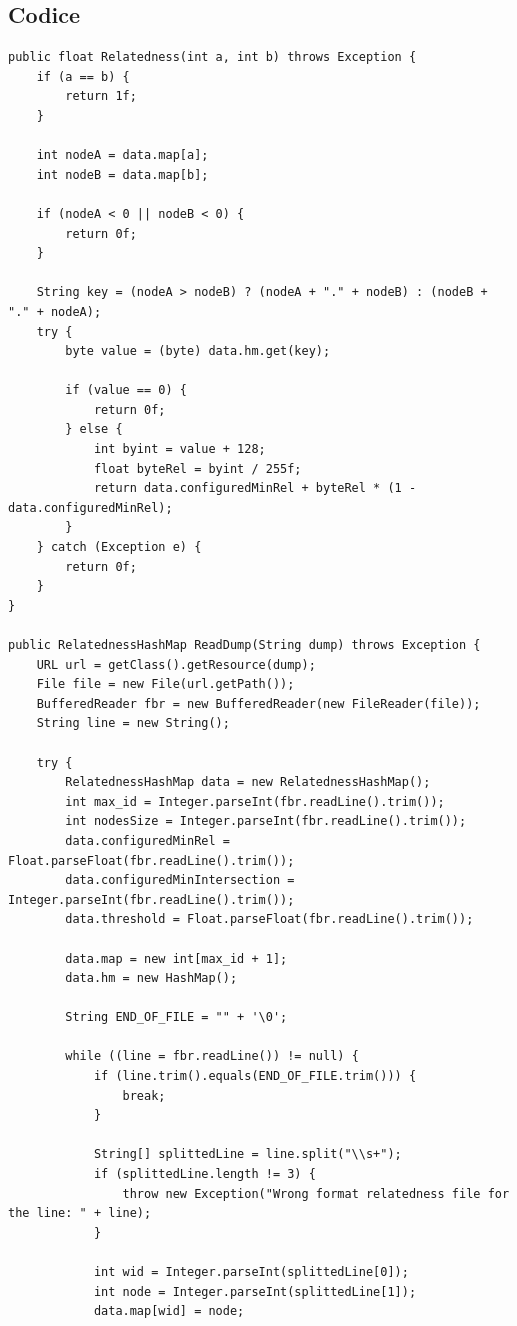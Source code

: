 \subsection{Codice}
\begin{lstlisting}[style=JavaStyle, caption=Implentazione con HashMap]
public float Relatedness(int a, int b) throws Exception {
    if (a == b) {
        return 1f;
    }

    int nodeA = data.map[a];
    int nodeB = data.map[b];

    if (nodeA < 0 || nodeB < 0) {
        return 0f;
    }

    String key = (nodeA > nodeB) ? (nodeA + "." + nodeB) : (nodeB + "." + nodeA);
    try {
        byte value = (byte) data.hm.get(key);

        if (value == 0) {
            return 0f;
        } else {
            int byint = value + 128;
            float byteRel = byint / 255f;
            return data.configuredMinRel + byteRel * (1 - data.configuredMinRel);
        }
    } catch (Exception e) {
        return 0f;
    }
}

public RelatednessHashMap ReadDump(String dump) throws Exception {
    URL url = getClass().getResource(dump);
    File file = new File(url.getPath());
    BufferedReader fbr = new BufferedReader(new FileReader(file));
    String line = new String();

    try {
        RelatednessHashMap data = new RelatednessHashMap();
        int max_id = Integer.parseInt(fbr.readLine().trim());
        int nodesSize = Integer.parseInt(fbr.readLine().trim());
        data.configuredMinRel = Float.parseFloat(fbr.readLine().trim());
        data.configuredMinIntersection = Integer.parseInt(fbr.readLine().trim());
        data.threshold = Float.parseFloat(fbr.readLine().trim());

        data.map = new int[max_id + 1];
        data.hm = new HashMap();

        String END_OF_FILE = "" + '\0';

        while ((line = fbr.readLine()) != null) {
            if (line.trim().equals(END_OF_FILE.trim())) {
                break;
            }

            String[] splittedLine = line.split("\\s+");
            if (splittedLine.length != 3) {
                throw new Exception("Wrong format relatedness file for the line: " + line);
            }

            int wid = Integer.parseInt(splittedLine[0]);
            int node = Integer.parseInt(splittedLine[1]);
            data.map[wid] = node;


\end{lstlisting}
